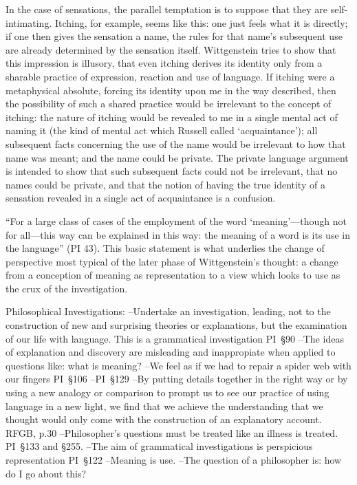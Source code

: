   In the case of sensations, the parallel temptation is to suppose that they
  are self-intimating. Itching, for example, seems like this: one just feels
  what it is directly; if one then gives the sensation a name, the rules for
  that name's subsequent use are already determined by the sensation itself.
  Wittgenstein tries to show that this impression is illusory, that even
  itching derives its identity only from a sharable practice of expression,
  reaction and use of language. If itching were a metaphysical absolute,
  forcing its identity upon me in the way described, then the possibility of
  such a shared practice would be irrelevant to the concept of itching: the
  nature of itching would be revealed to me in a single mental act of naming
  it (the kind of mental act which Russell called ‘acquaintance’); all
  subsequent facts concerning the use of the name would be irrelevant to how
  that name was meant; and the name could be private. The private language
  argument is intended to show that such subsequent facts could not be
  irrelevant, that no names could be private, and that the notion of having
  the true identity of a sensation revealed in a single act of acquaintance
  is a confusion.




    \begin{revision}
       ``For a large class of cases of the employment of the word ‘meaning’—though not
       for all—this way can be explained in this way: the meaning of a word is its use
       in the language'' (PI 43). This basic statement is what underlies the change of
       perspective most typical of the later phase of Wittgenstein's thought: a change
       from a conception of meaning as representation to a view which looks to use as
       the crux of the investigation. 
       \end{revision}

      \begin{revision}
      Philosophical Investigations:
      --Undertake an investigation, leading, not to the construction of new and
      surprising theories or explanations, but the examination of our life with
      language. This is a grammatical investigation PI~\S90 
      --The ideas of explanation and discovery are misleading and inappropiate when
      applied to questions like: what is meaning?
      --We feel as if we had to repair a spider web with our fingers PI~\S106
      --PI~\S129
      --By putting details together in the right way or by using a new analogy or
      comparison to prompt us to see our practice of using language in a new light, we
      find that we achieve the understanding that we thought would only come with the
      construction of an explanatory account. RFGB, p.30
      --Philosopher's questions must be treated like an illness is treated. PI~\S133
      and \S255.
      --The aim of grammatical investigations is perspicious representation PI~\S122
      --Meaning is use.
      --The question of a philosopher is: how do I go about this?
      \end{revision}


